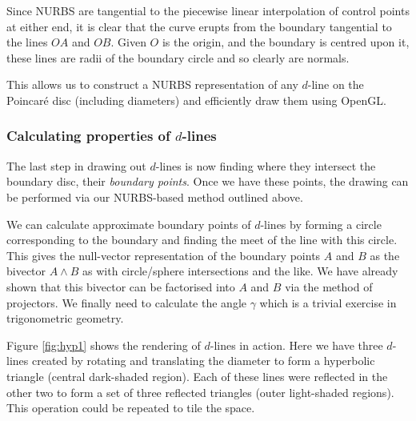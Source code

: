Since NURBS are tangential to the piecewise linear interpolation of control 
points
at either end, it is clear that the curve erupts from the boundary
tangential to the lines $OA$ and $OB$. Given $O$ is the origin, and the
boundary is centred upon it, these lines are radii of the boundary
circle and so clearly are normals.

This allows us to construct a NURBS representation of any $d$-line
on the Poincar\'e disc (including diameters) and efficiently draw them
using OpenGL. 

\subsubsection{Calculating properties of $d$-lines}

The last step in drawing out $d$-lines is now finding where they intersect
the boundary disc, their \emph{boundary points}. 
Once we have these points, the drawing can be performed
via our NURBS-based method outlined above.

We can calculate approximate boundary points of $d$-lines
by forming a circle 
corresponding to the boundary and finding the 
meet of the line with this circle. This gives the null-vector
representation of the boundary points $A$ and $B$ as the
bivector $A \wedge B$ as with circle/sphere intersections and the like.
We have already shown that this bivector can be factorised into $A$ and 
$B$ via the method of projectors.
We finally need to calculate the angle $\gamma$ which is a trivial
exercise in trigonometric geometry. 

Figure
\ref{fig:hyp1} shows the rendering of $d$-lines in action.
Here we have three $d$-lines created by rotating and translating the
diameter to form a hyperbolic triangle (central dark-shaded
region). Each of these lines were reflected in the other two to form 
a set of three reflected triangles (outer light-shaded regions). This
operation could be repeated to tile the space.

